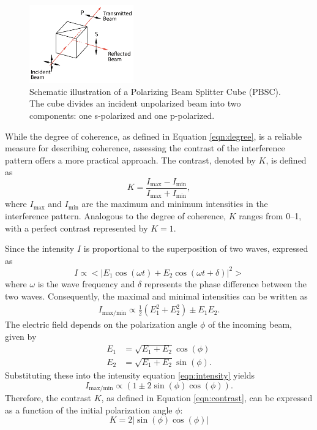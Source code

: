 \begin{figure}
    \centering
    \includegraphics[width=0.4\textwidth]{pictures/PBSC.png}
    \caption{Schematic illustration of a Polarizing Beam Splitter Cube (PBSC). The cube divides an incident unpolarized beam into two components: one s-polarized and one p-polarized.}
    \label{fig:PBSC}
\end{figure}

While the degree of coherence, as defined in Equation \eqref{eqn:degree}, is a reliable 
measure for describing coherence, assessing the contrast of the interference pattern 
offers a more practical approach. The contrast, denoted by $K$, is defined as
\begin{equation}
    K=\frac{I_\text{max}-I_\text{min}}{I_\text{max}+I_\text{min}},
    \label{eqn:contrast}
\end{equation}
where $I_\text{max}$ and $I_\text{min}$ are the maximum and minimum intensities in the 
interference pattern. Analogous to the degree of coherence, $K$ ranges from 
\numrange{0}{1}, with a perfect contrast represented by $K=1$.

Since the intensity $I$ is proportional to the superposition of two waves, expressed as
\begin{equation*}
    I\propto<|E_1\cos(\omega t)+E_2\cos(\omega t +\delta)|^2>
    \label{eqn:intensity}
\end{equation*}
where $\omega$ is the wave frequency and $\delta$ represents the phase difference 
between the two waves. Consequently, the maximal and minimal intensities can be written as
\begin{align*}
    I_\text{max/min}\propto\frac{1}{2}(E_1^2+E_2^2)\pm E_1E_2.
\end{align*}
The electric field depends on the polarization angle $\phi$ of the incoming beam, given by
\begin{align*}
    E_1&=\sqrt{E_1+E_2}\cos(\phi) \\
    E_2&=\sqrt{E_1+E_2}\sin(\phi).
\end{align*}
Substituting these into the intensity equation \eqref{eqn:intensity} yields
\begin{equation*}
    I_\text{max/min}\propto (1\pm 2\sin(\phi)\cos(\phi)).
\end{equation*}
Therefore, the contrast $K$, as defined in Equation \eqref{eqn:contrast}, can be 
expressed as a function of the initial polarization angle $\phi$:
\begin{equation}
    K=2|\sin(\phi)\cos(\phi)|
    \label{eqn:contrast2}
\end{equation}

